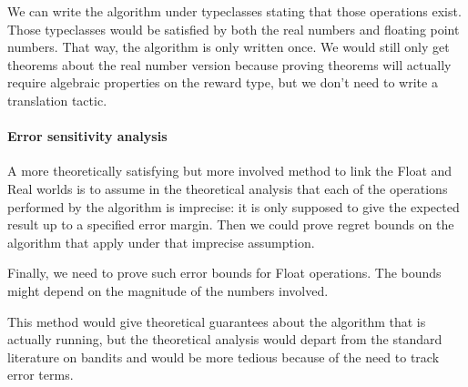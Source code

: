 We can write the algorithm under typeclasses stating that those operations exist. Those typeclasses would be satisfied by both the real numbers and floating point numbers.
That way, the algorithm is only written once.
We would still only get theorems about the real number version because proving theorems will actually require algebraic properties on the reward type, but we don't need to write a translation tactic.


\paragraph{Error sensitivity analysis}

A more theoretically satisfying but more involved method to link the Float and Real worlds is to assume in the theoretical analysis that each of the operations performed by the algorithm is imprecise: it is only supposed to give the expected result up to a specified error margin.
Then we could prove regret bounds on the algorithm that apply under that imprecise assumption.

Finally, we need to prove such error bounds for Float operations. The bounds might depend on the magnitude of the numbers involved.

This method would give theoretical guarantees about the algorithm that is actually running, but the theoretical analysis would depart from the standard literature on bandits and would be more tedious because of the need to track error terms.
